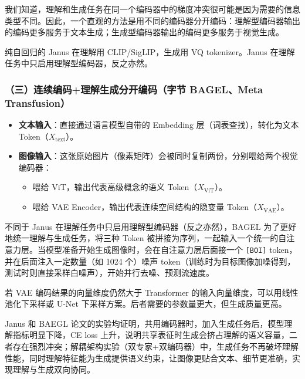我们知道，理解和生成任务在同一个编码器中的梯度冲突很可能是因为需要的信息类型不同。因此，一个直观的方法是用不同的编码器分开编码：理解型编码器输出的编码更多服务于文本生成；生成型编码器输出的编码更多服务于视觉生成。

纯自回归的 Janus 在理解用 CLIP/SigLIP，生成用 VQ tokenizer。Janus 在理解任务中只启用理解型编码器，反之亦然。

\hypertarget{ux4e09ux8fdeux7eedux7f16ux7801ux7406ux89e3ux751fux6210ux5206ux5f00ux7f16ux7801ux5b57ux8282-bagelmeta-transfusion}{%
\subsubsection{（三）连续编码+理解生成分开编码（字节 BAGEL、Meta Transfusion）}\label{ux4e09ux8fdeux7eedux7f16ux7801ux7406ux89e3ux751fux6210ux5206ux5f00ux7f16ux7801ux5b57ux8282-bagelmeta-transfusion}}

\begin{itemize}
\tightlist
\item
  \textbf{文本输入}：直接通过语言模型自带的 Embedding 层（词表查找），转化为文本 Token（\(X_{\mathrm{text}}\)）。
\item
{}
  \textbf{图像输入}：这张原始图片（像素矩阵）会被同时复制两份，分别喂给两个视觉编码器：

  \begin{itemize}
  \tightlist
  \item
    喂给 ViT，输出代表高级概念的语义 Token（\(X_{\mathrm{ViT}}\)）。
  \item
    喂给 VAE Encoder，输出代表连续空间结构的隐变量 Token（\(X_{\mathrm{VAE}}\)）。
  \end{itemize}
\end{itemize}

不同于 Janus 在理解任务中只启用理解型编码器（反之亦然），BAGEL 为了更好地统一理解与生成任务，将三种 Token 被拼接为序列，一起输入一个统一的自注意力层。当模型准备开始生成图像时，会在自注意力层后面接一个 \texttt{{[}BOI{]}} token，并在后面注入一定数量（如 1024 个）噪声 token（训练时为目标图像加噪得到，测试时则直接采样白噪声），开始并行去噪、预测流速度。

若 VAE 编码结果的向量维度仍然大于 Transformer 的输入向量维度，可以用线性池化下采样或 U-Net 下采样方案。后者需要的参数量更大，但生成质量更高。

Janus 和 BAEGL 论文的实验均证明，共用编码器时，加入生成任务后，模型理解指标明显下降，CE loss 上升，说明共享表征时生成会挤占理解的语义容量，二者存在强烈冲突；解耦架构实验（双专家+双编码器）中，生成任务不再破坏理解性能，同时理解特征能为生成提供语义约束，让图像更贴合文本、细节更准确，实现理解与生成双向协同。

